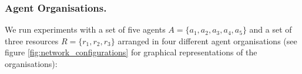 \documentclass{llncs}
\begin{document}
\subsubsection{Agent Organisations.}
We run experiments with a set of five agents $A= \{ a_1,a_2,a_3,a_4,a_5 \} $ and a set of  three resources $R=\{r_1,r_2,r_3\}$ arranged in four different agent organisations (see figure \ref{fig:network_configurations} for graphical representations of the organisations):
\end{document}
